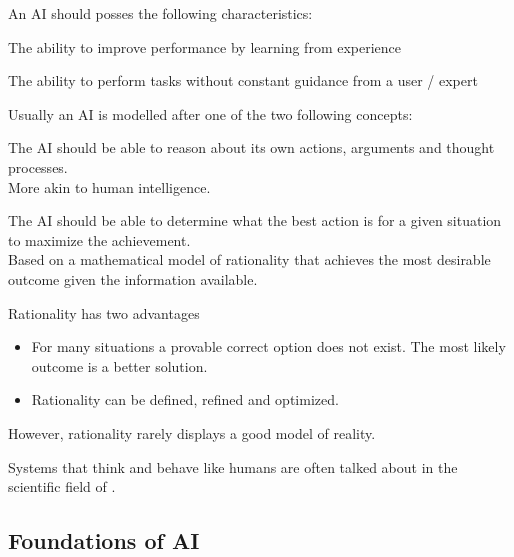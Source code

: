 \documentclass[
../../EiKI_Summary.tex,
]
{subfiles}
\begin{document}
An AI should posses the following characteristics:

\begin{defbox}
    [Adaptability]
    The ability to improve performance by learning from experience
\end{defbox}

\begin{defbox}
    [Autonomous]
    The ability to perform tasks without constant guidance from a user / expert
\end{defbox}

Usually an AI is modelled after one of the two following concepts:

\begin{defbox}
    The AI should be able to reason about its own actions, arguments and thought processes.\\
    More akin to human intelligence.
\end{defbox}

\begin{defbox}
    The AI should be able to determine what the best action is for a given situation to maximize the achievement.\\
    Based on a mathematical model of rationality that achieves the most desirable outcome given the information available.
\end{defbox}

Rationality has two advantages
\begin{itemize}
    \item {} For many situations a provable correct option does not exist. The most likely outcome is a better solution.
    \item {} Rationality can be defined, refined and optimized.
\end{itemize}
However, rationality rarely displays a good model of reality.

Systems that think and behave like humans are often talked about in the scientific field of .

\subsection{Foundations of AI}
\end{document}
